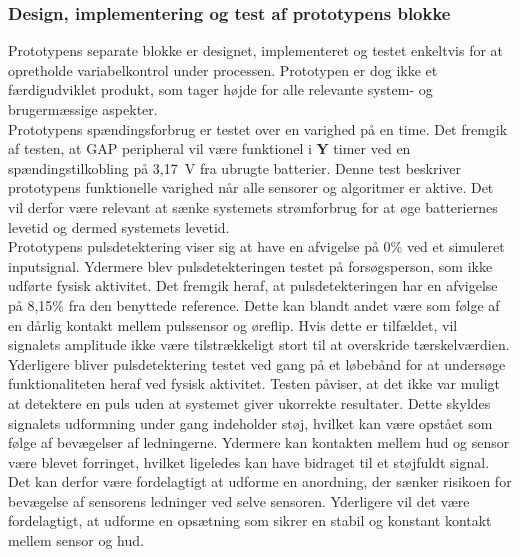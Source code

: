 \subsubsection{Design, implementering og test af prototypens blokke}
Prototypens separate blokke er designet, implementeret og testet enkeltvis for at opretholde variabelkontrol under processen. Prototypen er dog ikke et færdigudviklet produkt, som tager højde for alle relevante system- og brugermæssige aspekter.\\
Prototypens spændingsforbrug er testet over en varighed på en time. Det fremgik af testen, at GAP peripheral vil være funktionel i \textbf{Y} timer ved en spændingstilkobling på 3,17~V fra ubrugte batterier. Denne test beskriver prototypens funktionelle varighed når alle sensorer og algoritmer er aktive. Det vil derfor være relevant at sænke systemets strømforbrug for at øge batteriernes levetid og dermed systemets levetid.\\
Prototypens pulsdetektering viser sig at have en afvigelse på 0\% ved et simuleret inputsignal. Ydermere blev pulsdetekteringen testet på forsøgsperson, som ikke udførte fysisk aktivitet. Det fremgik heraf, at pulsdetekteringen har en afvigelse på 8,15\% fra den benyttede reference. Dette kan blandt andet være som følge af en dårlig kontakt mellem pulssensor og øreflip. Hvis dette er tilfældet, vil signalets amplitude ikke være tilstrækkeligt stort til at overskride tærskelværdien. Yderligere bliver pulsdetektering testet ved gang på et løbebånd for at undersøge funktionaliteten heraf ved fysisk aktivitet. Testen påviser, at det ikke var muligt at detektere en puls uden at systemet giver ukorrekte resultater. Dette skyldes signalets udformning under gang indeholder støj, hvilket kan være opstået som følge af bevægelser af ledningerne. Ydermere kan kontakten mellem hud og sensor være blevet forringet, hvilket ligeledes kan have bidraget til et støjfuldt signal. Det kan derfor være fordelagtigt at udforme en anordning, der sænker risikoen for bevægelse af sensorens ledninger ved selve sensoren. Yderligere vil det være fordelagtigt, at udforme en opsætning som sikrer en stabil og konstant kontakt mellem sensor og hud.\\
